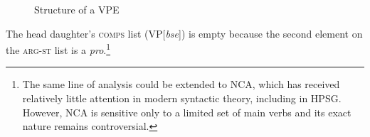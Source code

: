 {\begin{figure}
\caption{Structure of a VPE}\label{fig-53}
\end{figure}
%
The head daughter's \textsc{comps} list (VP[\textit{bse}]) is empty because the second element on the \textsc{arg-st} list
is a \textit{pro}.\footnote{%
%
The same line of analysis could be extended to 
NCA, which has received relatively little attention in modern syntactic theory, including in HPSG. However, NCA is sensitive only to a limited set of main verbs and its exact nature remains controversial.}

}
